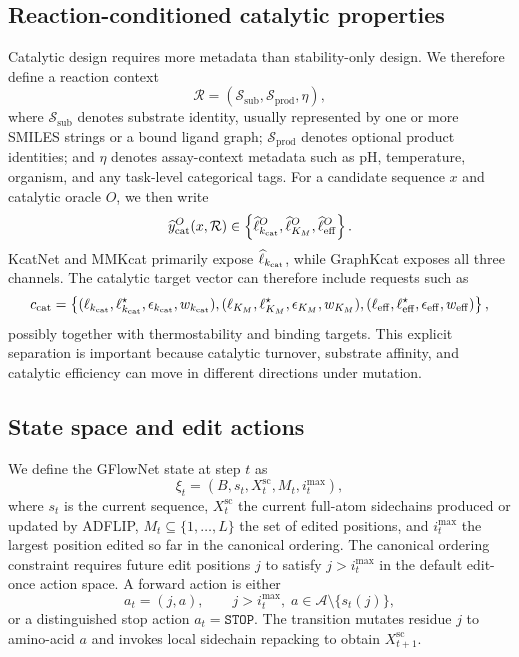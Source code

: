 \documentclass[11pt]{article}
\newcommand{\Aset}{\mathcal{A}}
\begin{document}
	\subsection{Reaction-conditioned catalytic properties}
	
	Catalytic design requires more metadata than stability-only design. We therefore define a reaction context
	\begin{equation}
		\mathcal{R} = (\mathcal{S}_{\mathrm{sub}}, \mathcal{S}_{\mathrm{prod}}, \eta),
	\end{equation}
	where $\mathcal{S}_{\mathrm{sub}}$ denotes substrate identity, usually represented by one or more SMILES strings or a bound ligand graph; $\mathcal{S}_{\mathrm{prod}}$ denotes optional product identities; and $\eta$ denotes assay-context metadata such as pH, temperature, organism, and any task-level categorical tags. For a candidate sequence $x$ and catalytic oracle $O$, we then write
	\begin{equation}
		\widehat y_{\mathrm{cat}}^{O}(x,\mathcal{R}) \in \left\{
		\widehat \ell_{k_{\rm cat}}^{O},
		\widehat \ell_{K_M}^{O},
		\widehat \ell_{\mathrm{eff}}^{O}
		\right\}.
	\end{equation}
	KcatNet and MMKcat primarily expose $\widehat \ell_{k_{\rm cat}}$, while GraphKcat exposes all three channels. The catalytic target vector can therefore include requests such as
	\begin{equation}
		c_{\mathrm{cat}} = \left\{
		(\ell_{k_{\rm cat}},\ell_{k_{\rm cat}}^{\star},\epsilon_{k_{\rm cat}},w_{k_{\rm cat}}),
		(\ell_{K_M},\ell_{K_M}^{\star},\epsilon_{K_M},w_{K_M}),
		(\ell_{\mathrm{eff}},\ell_{\mathrm{eff}}^{\star},\epsilon_{\mathrm{eff}},w_{\mathrm{eff}})
		\right\},
	\end{equation}
	possibly together with thermostability and binding targets. This explicit separation is important because catalytic turnover, substrate affinity, and catalytic efficiency can move in different directions under mutation.
	
	\subsection{State space and edit actions}
	
	We define the GFlowNet state at step $t$ as
	\begin{equation}
		\xi_t = (B, s_t, X_t^{\mathrm{sc}}, M_t, i_t^{\max}),
	\end{equation}
	where $s_t$ is the current sequence, $X_t^{\mathrm{sc}}$ the current full-atom sidechains produced or updated by ADFLIP, $M_t\subseteq\{1,\ldots,L\}$ the set of edited positions, and $i_t^{\max}$ the largest position edited so far in the canonical ordering. The canonical ordering constraint requires future edit positions $j$ to satisfy $j>i_t^{\max}$ in the default edit-once action space. A forward action is either
	\begin{equation}
		a_t=(j,a),\qquad j>i_t^{\max},\; a\in\Aset\setminus\{s_t(j)\},
	\end{equation}
	or a distinguished stop action $a_t=\mathtt{STOP}$. The transition mutates residue $j$ to amino-acid $a$ and invokes local sidechain repacking to obtain $X^{\mathrm{sc}}_{t+1}$.
	
\end{document}
